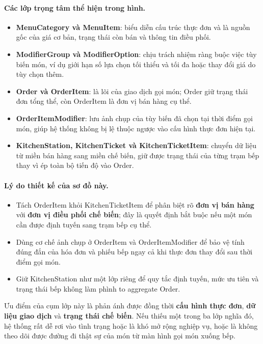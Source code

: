 \documentclass[11pt,a4paper]{article}
\begin{document}
\paragraph{Các lớp trọng tâm thể hiện trong hình.}
\begin{itemize}
  \item \textbf{\textsf{MenuCategory} và \textsf{MenuItem}}: biểu diễn cấu trúc thực đơn và là nguồn gốc của giá cơ bản, trạng thái còn bán và thông tin điều phối.
  \item \textbf{\textsf{ModifierGroup} và \textsf{ModifierOption}}: chịu trách nhiệm ràng buộc việc tùy biến món, ví dụ giới hạn số lựa chọn tối thiểu và tối đa hoặc thay đổi giá do tùy chọn thêm.
  \item \textbf{\textsf{Order} và \textsf{OrderItem}}: là lõi của giao dịch gọi món; \textsf{Order} giữ trạng thái đơn tổng thể, còn \textsf{OrderItem} là đơn vị bán hàng cụ thể.
  \item \textbf{\textsf{OrderItemModifier}}: lưu ảnh chụp của tùy biến đã chọn tại thời điểm gọi món, giúp hệ thống không bị lệ thuộc ngược vào cấu hình thực đơn hiện tại.
  \item \textbf{\textsf{KitchenStation}, \textsf{KitchenTicket} và \textsf{KitchenTicketItem}}: chuyển dữ liệu từ miền bán hàng sang miền chế biến, giữ được trạng thái của từng trạm bếp thay vì ép toàn bộ tiến độ vào \textsf{Order}.
\end{itemize}

\paragraph{Lý do thiết kế của sơ đồ này.}
\begin{itemize}
  \item Tách \textsf{OrderItem} khỏi \textsf{KitchenTicketItem} để phân biệt rõ \textbf{đơn vị bán hàng} với \textbf{đơn vị điều phối chế biến}; đây là quyết định bắt buộc nếu một món cần được định tuyến sang trạm bếp cụ thể.
  \item Dùng cơ chế ảnh chụp ở \textsf{OrderItem} và \textsf{OrderItemModifier} để bảo vệ tính đúng đắn của hóa đơn và phiếu bếp ngay cả khi thực đơn thay đổi sau thời điểm gọi món.
  \item Giữ \textsf{KitchenStation} như một lớp riêng để quy tắc định tuyến, mức ưu tiên và trạng thái bếp không làm phình to aggregate \textsf{Order}.
\end{itemize}

Ưu điểm của cụm lớp này là phản ánh được đồng thời \textbf{cấu hình thực đơn}, \textbf{dữ liệu giao dịch} và \textbf{trạng thái chế biến}. Nếu thiếu một trong ba lớp nghĩa đó, hệ thống rất dễ rơi vào tình trạng hoặc là khó mở rộng nghiệp vụ, hoặc là không theo dõi được đường đi thật sự của món từ màn hình gọi món xuống bếp.
\end{document}
